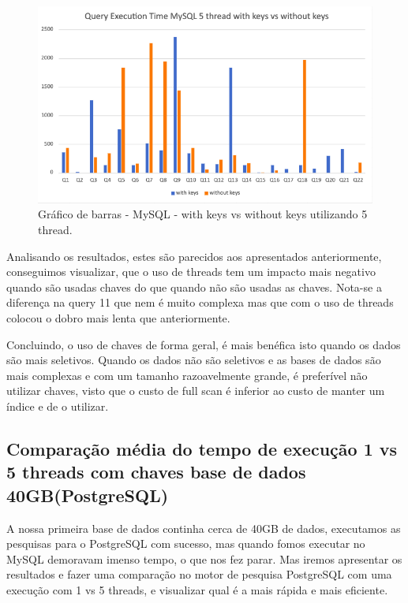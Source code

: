 \documentclass{article}
\begin{document}
\begin{figure}[H]
  \centering
  \includegraphics[width=\textwidth]{Graphs/mysql5threads_withkeys_withoutkeys.png}
  \caption{Gráfico de barras - MySQL - with keys vs without keys utilizando 5 thread.} 
  \label{fig:PKCreation2}
\end{figure}

Analisando os resultados, estes são parecidos aos apresentados anteriormente, conseguimos visualizar, que o uso de threads tem um impacto mais negativo quando são usadas chaves do que quando não são usadas as chaves. Nota-se a diferença na query 11 que nem é muito complexa mas que com o uso de threads colocou o dobro mais lenta que anteriormente.

Concluindo, o uso de chaves de forma geral, é mais benéfica isto quando os dados são mais seletivos. Quando os dados não são seletivos e as bases de dados são mais complexas e com um tamanho razoavelmente grande, é preferível não utilizar chaves, visto que o custo de full scan é inferior ao custo de manter um índice e de o utilizar.
\clearpage
\subsection{Comparação média do tempo de execução 1 vs 5 threads com chaves base de dados 40GB(PostgreSQL)}

\texttt{}\par A nossa primeira base de dados continha cerca de 40GB de dados, executamos as pesquisas para o PostgreSQL com sucesso, mas quando fomos executar no MySQL demoravam imenso tempo, o que nos fez parar. Mas iremos apresentar os resultados e fazer uma comparação no motor de pesquisa PostgreSQL com uma execução com 1 vs 5 threads, e visualizar qual é a mais rápida e mais eficiente.
\end{document}
